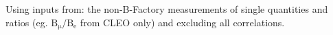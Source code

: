\noindent Using inputs from: the non-B-Factory measurements of single quantities and ratios (eg. $\mathrm{B_\mu/B_e}$ from CLEO only) and excluding all correlations.
